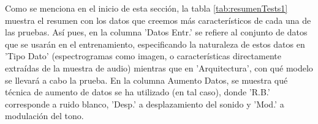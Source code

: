 \documentclass[11pt,a4paper,spanish]{book}
\begin{document}
	
	
    \setlength{\leftskip}{0cm}
	Como se menciona en el inicio de esta sección, la tabla \ref{tab:resumenTests1} muestra el resumen con los datos que creemos más característicos de cada una de las pruebas. Así pues, en la columna 'Datos Entr.' se refiere al conjunto de datos que se usarán en el entrenamiento, especificando la naturaleza de estos datos en 'Tipo Dato' (espectrogramas como imagen, o características directamente extraídas de la muestra de audio) mientras que en 'Arquitectura', con qué modelo se llevará a cabo la prueba. En la columna Aumento Datos, se muestra qué técnica de aumento de datos se ha utilizado (en tal caso), donde 'R.B.' corresponde a ruido blanco, 'Desp.' a desplazamiento del sonido y 'Mod.' a modulación del tono.
\end{document}
